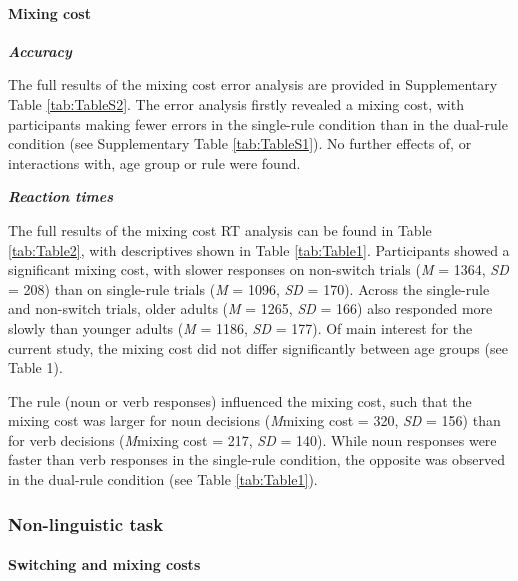 \documentclass[
]{article}
\begin{document}
\hypertarget{mixing-cost}{%
\paragraph{Mixing cost}\label{mixing-cost}}

\hfill\break

\textbf{\emph{Accuracy}}

The full results of the mixing cost error analysis are provided in Supplementary Table \ref{tab:TableS2}. The error analysis firstly revealed a mixing cost, with participants making fewer errors in the single-rule condition than in the dual-rule condition (see Supplementary Table \ref{tab:TableS1}). No further effects of, or interactions with, age group or rule were found.

\textbf{\emph{Reaction times}}

The full results of the mixing cost RT analysis can be found in Table \ref{tab:Table2}, with descriptives shown in Table \ref{tab:Table1}. Participants showed a significant mixing cost, with slower responses on non-switch trials (\emph{M} = 1364, \emph{SD} = 208) than on single-rule trials (\emph{M} = 1096, \emph{SD} = 170). Across the single-rule and non-switch trials, older adults (\emph{M} = 1265, \emph{SD} = 166) also responded more slowly than younger adults (\emph{M} = 1186, \emph{SD} = 177). Of main interest for the current study, the mixing cost did not differ significantly between age groups (see Table 1).

The rule (noun or verb responses) influenced the mixing cost, such that the mixing cost was larger for noun decisions (\emph{M}mixing cost = 320, \emph{SD} = 156) than for verb decisions (\emph{M}mixing cost = 217, \emph{SD} = 140). While noun responses were faster than verb responses in the single-rule condition, the opposite was observed in the dual-rule condition (see Table \ref{tab:Table1}).

\hypertarget{non-linguistic-task}{%
\subsubsection{Non-linguistic task}\label{non-linguistic-task}}

\hypertarget{switching-and-mixing-costs}{%
\paragraph{Switching and mixing costs}\label{switching-and-mixing-costs}}
\end{document}
